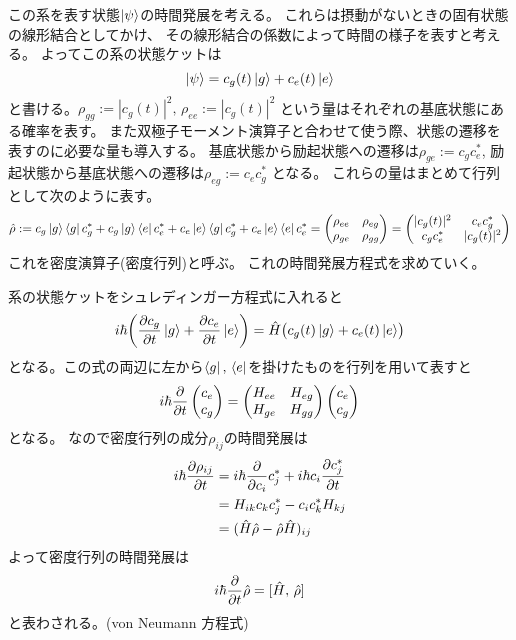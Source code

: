 \documentclass[11pt,dvipdfmx,a4paper]{jsarticle}
\begin{document}
この系を表す状態\(\ket{\psi}\)の時間発展を考える。
これらは摂動がないときの固有状態の線形結合としてかけ、
その線形結合の係数によって時間の様子を表すと考える。
よってこの系の状態ケットは
\begin{equation}
	\ket{\psi} = c_g (t) \ket{g} + c_e (t) \ket{e}
\end{equation}
と書ける。\(\rho_{gg}:=|c_g(t)|^2,\,\rho_{ee}:=|c_g(t)|^2\) という量はそれぞれの基底状態にある確率を表す。
また双極子モーメント演算子と合わせて使う際、状態の遷移を表すのに必要な量も導入する。
基底状態から励起状態への遷移は\(\rho_{ge} := c_g c_e^*\),
励起状態から基底状態への遷移は\(\rho_{eg} := c_e c_g^*\)
となる。
これらの量はまとめて行列として次のように表す。
\begin{equation}
	\hat{\rho} := c_g \ket{g}\bra{g} c_g^*
	+ c_g \ket{g}\bra{e} c_e^*
	+ c_e \ket{e}\bra{g} c_g^*
	+ c_e \ket{e}\bra{e} c_e^*
	=
	\begin{pmatrix}
		\rho_{ee} & \rho_{eg}\\
		\rho_{ge} & \rho_{gg}
	\end{pmatrix}
	=
	\begin{pmatrix}
		|c_g(t)|^2 & c_e c_g^*\\
		c_g c_e^* & |c_g(t)|^2
	\end{pmatrix}
\end{equation}
これを密度演算子(密度行列)と呼ぶ。
これの時間発展方程式を求めていく。

系の状態ケットをシュレディンガー方程式に入れると
\begin{equation}
	i\hbar\qty(\pdv{c_g}{t}\ket{g}+\pdv{c_e}{t}\ket{e}) = \hat{H}\bigl(c_g (t) \ket{g} + c_e (t) \ket{e}\bigr)
\end{equation}
となる。この式の両辺に左から\(\bra{g},\,\bra{e}\)を掛けたものを行列を用いて表すと
\begin{equation}
	i\hbar\pdv{t}
	\begin{pmatrix}
		c_e\\
		c_g
	\end{pmatrix}
	=
	\begin{pmatrix}
		H_{ee} & H_{eg}\\
		H_{ge} & H_{gg}
	\end{pmatrix}
	\begin{pmatrix}
		c_e\\
		c_g
	\end{pmatrix}
\end{equation}
となる。
なので密度行列の成分\(\rho_{ij}\)の時間発展は
\begin{align}
	i\hbar\pdv{\rho_{ij}}{t} &= i\hbar\pdv{c_i}c_j^*+i\hbar c_i \pdv{c_j^*}{t}\\
	&= H_{ik} c_k c_j^* - c_i c_k^* H_{kj}\\
	&= (\hat{H}\hat{\rho}-\hat{\rho}\hat{H})_{ij}
\end{align}
よって密度行列の時間発展は
\begin{equation}
	i\hbar \pdv{t} \hat{\rho} = [\hat{H},\,\hat{\rho}]
\end{equation}
と表わされる。(von Neumann 方程式)
\end{document}
